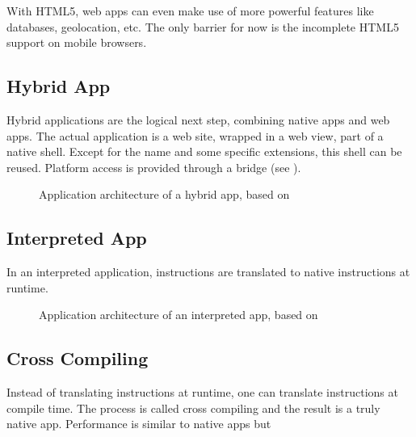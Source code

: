 \npar With HTML5, web apps can even make use of more powerful features like databases, geolocation, etc. The only barrier for now is the incomplete HTML5 support on mobile browsers.

\subsection{Hybrid App}

\npar Hybrid applications are the logical next step, combining native apps and web apps. The actual application is a web site, wrapped in a web view, part of a native shell. Except for the name and some specific extensions, this shell can be reused. Platform access is provided through a bridge (see ). 

\begin{figure}
    \begin{center}
        \caption{
            Application architecture of a hybrid app, based on \citep{Friese}
        }
        \label{fig:hybrid}
    \end{center}
\end{figure}

\npar

\subsection{Interpreted App}

\npar In an interpreted application, instructions are translated to native instructions at runtime.

\begin{figure}
    \begin{center}
        \caption{
            Application architecture of an interpreted app, based on \citep{Friese}
        }
        \label{fig:interpreted}
    \end{center}
\end{figure}

\subsection{Cross Compiling}

\npar Instead of translating instructions at runtime, one can translate instructions at compile time. The process is called cross compiling and the result is a truly native app. Performance is similar to native apps but 

